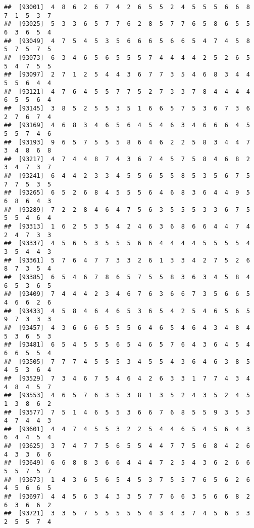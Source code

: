 \documentclass[
]{book}
\begin{document}
\begin{verbatim}
##  [93001]  4  8  6  2  6  7  4  2  6  5  5  2  4  5  5  5  6  6  8  7  1  5  3  7
##  [93025]  5  3  3  6  5  7  7  6  2  8  5  7  7  6  5  8  6  5  5  6  3  6  5  4
##  [93049]  4  7  5  4  5  3  5  6  6  6  5  6  6  5  4  7  4  5  8  5  7  5  7  5
##  [93073]  6  3  4  6  5  6  5  5  5  7  4  4  4  4  2  5  2  6  5  5  4  7  5  5
##  [93097]  2  7  1  2  5  4  4  3  6  7  7  3  5  4  6  8  3  4  4  5  5  6  4  4
##  [93121]  4  7  6  4  5  5  7  7  5  2  7  3  3  7  8  4  4  4  4  6  5  5  6  4
##  [93145]  3  8  5  2  5  5  3  5  1  6  6  5  7  5  3  6  7  3  6  2  7  6  7  4
##  [93169]  4  6  8  3  4  6  5  6  4  5  4  6  3  4  6  6  6  4  5  5  5  7  4  6
##  [93193]  9  6  5  7  5  5  5  8  6  4  6  2  2  5  8  3  4  4  7  3  4  8  6  8
##  [93217]  4  7  4  4  8  7  4  3  6  7  4  5  7  5  8  4  6  8  2  3  4  7  3  7
##  [93241]  6  4  4  2  3  3  4  5  5  6  5  5  8  5  3  5  6  7  5  7  7  5  3  5
##  [93265]  6  5  2  6  8  4  5  5  5  6  4  6  8  3  6  4  4  9  5  6  8  6  4  3
##  [93289]  7  2  2  8  4  6  4  7  5  6  3  5  5  5  3  3  6  7  5  5  5  4  6  4
##  [93313]  1  6  2  5  3  5  4  2  4  6  3  6  8  6  6  4  4  7  4  2  4  7  3  3
##  [93337]  4  5  6  5  3  5  5  5  6  6  4  4  4  4  5  5  5  5  4  3  5  4  4  3
##  [93361]  5  7  6  4  7  7  3  3  2  6  1  3  3  4  2  7  5  2  6  8  7  3  5  4
##  [93385]  6  5  4  6  7  8  6  5  7  5  5  8  3  6  3  4  5  8  4  6  5  3  6  5
##  [93409]  7  4  4  4  2  3  4  6  7  6  3  6  6  7  3  5  6  6  5  4  6  6  2  6
##  [93433]  4  5  8  4  6  4  6  5  3  6  5  4  2  5  4  6  5  6  5  9  7  3  3  3
##  [93457]  4  3  6  6  6  5  5  5  6  4  6  5  4  6  4  3  4  8  4  5  3  6  5  3
##  [93481]  6  5  4  5  5  5  6  5  4  6  5  7  6  4  3  6  4  5  4  6  6  5  5  4
##  [93505]  7  7  7  4  5  5  5  3  4  5  5  4  3  6  4  6  3  8  5  4  5  3  6  4
##  [93529]  7  3  4  6  7  5  4  6  4  2  6  3  3  1  7  7  4  3  4  4  8  4  5  7
##  [93553]  4  6  5  7  6  3  5  3  8  1  3  5  2  4  3  5  2  4  5  1  3  8  6  2
##  [93577]  7  5  1  4  6  5  5  3  6  6  7  6  8  5  5  9  3  5  3  4  7  4  4  3
##  [93601]  4  4  7  4  5  5  3  2  2  5  4  4  6  5  4  5  6  4  3  6  4  4  5  4
##  [93625]  3  7  4  7  7  5  6  5  5  4  4  7  7  5  6  8  4  2  6  4  3  3  6  6
##  [93649]  6  6  8  8  3  6  6  4  4  4  7  2  5  4  3  6  2  6  6  5  5  7  5  7
##  [93673]  1  4  3  6  5  6  5  4  5  3  7  5  5  7  6  5  6  2  6  4  5  6  6  5
##  [93697]  4  4  5  6  3  4  3  3  5  7  7  6  6  3  5  6  6  8  2  6  3  6  6  2
##  [93721]  3  3  5  7  5  5  5  5  5  4  3  4  3  7  4  5  6  3  3  2  5  5  7  4

\end{verbatim}
\end{document}
